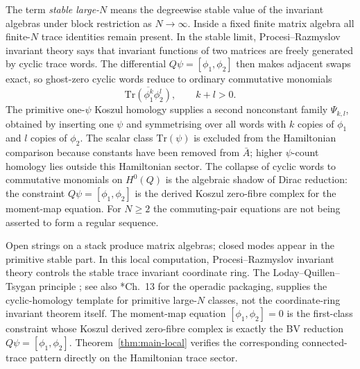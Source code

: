 \documentclass[11pt]{memoir}
\begin{document}
The term \emph{stable large-$N$} means the degreewise stable value of the
invariant algebras under block restriction as $N\to\infty$. Inside a fixed
finite matrix algebra all finite-$N$ trace identities remain present. In
the stable limit, Procesi--Razmyslov invariant theory
\cites{procesi,razmyslov} says that invariant functions of two matrices
are freely generated by cyclic trace words. The differential
$Q\psi=[\phi_1,\phi_2]$ then makes adjacent swaps exact, so ghost-zero
cyclic words reduce to ordinary commutative monomials
$$\overline{\mathrm{Tr}(\phi_1^k\phi_2^l)},\qquad k+l>0.$$
The primitive one-$\psi$ Koszul homology supplies a second nonconstant
family $\Psi_{k,l}$, obtained by inserting one $\psi$ and symmetrising over
all words with $k$ copies of $\phi_1$ and $l$ copies of $\phi_2$. The
scalar class $\mathrm{Tr}(\psi)$ is excluded from the Hamiltonian
comparison because constants have been removed from $\bar A$; higher
$\psi$-count homology lies outside this Hamiltonian sector. The collapse
of cyclic words to commutative monomials on $H^0(Q)$ is the algebraic
shadow of Dirac reduction: the constraint
$Q\psi=[\phi_1,\phi_2]$ is the derived Koszul zero-fibre complex for the
moment-map equation.  For \(N\ge2\) the commuting-pair equations are not
being asserted to form a regular sequence.

Open strings on a stack produce matrix algebras; closed modes appear in
the primitive stable part. In this local computation,
Procesi--Razmyslov invariant theory controls the stable trace invariant
coordinate ring.  The Loday--Quillen--Tsygan principle
\cites{loday-quillen,tsygan}; see also
\cite{loday-vallette}*{Ch.~13} for the operadic packaging, supplies the
cyclic-homology template for primitive large-\(N\) classes, not the
coordinate-ring invariant theorem itself. The moment-map equation
$[\phi_1,\phi_2]=0$ is the first-class constraint whose Koszul derived
zero-fibre complex is exactly the BV reduction
$Q\psi=[\phi_1,\phi_2]$.  Theorem~\ref{thm:main-local} verifies the
corresponding connected-trace pattern directly on the Hamiltonian trace
sector.
\end{document}

